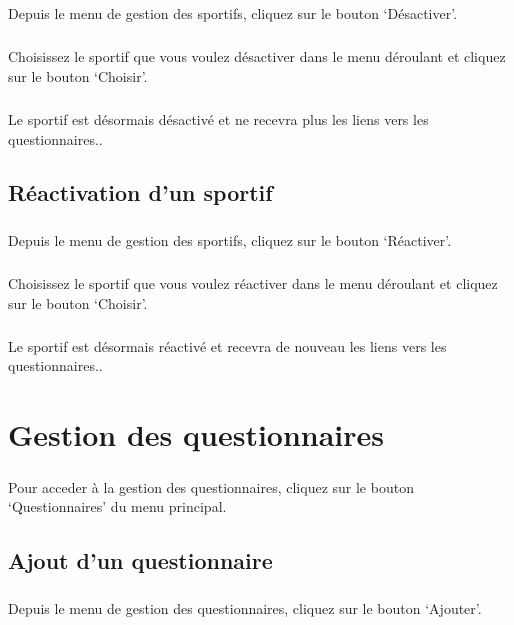 \documentclass[french,12pt,a4paper,openany]{book}
\begin{document}
			\paragraph{}{Depuis le menu de gestion des sportifs, cliquez sur le bouton `Désactiver'.}
			\paragraph{}{Choisissez le sportif que vous voulez désactiver dans le menu déroulant et cliquez sur le bouton `Choisir'.}
			\paragraph{}{Le sportif est désormais désactivé et ne recevra plus les liens vers les questionnaires.}.
		\section{Réactivation d'un sportif}
			\paragraph{}{Depuis le menu de gestion des sportifs, cliquez sur le bouton `Réactiver'.}
			\paragraph{}{Choisissez le sportif que vous voulez réactiver dans le menu déroulant et cliquez sur le bouton `Choisir'.}
			\paragraph{}{Le sportif est désormais réactivé et recevra de nouveau les liens vers les questionnaires.}.
	\chapter{Gestion des questionnaires}
		\paragraph{}{Pour acceder à la gestion des questionnaires, cliquez sur le bouton `Questionnaires' du menu principal.}
		\section{Ajout d'un questionnaire}
			\paragraph{}{Depuis le menu de gestion des questionnaires, cliquez sur le bouton `Ajouter'.}
\end{document}
